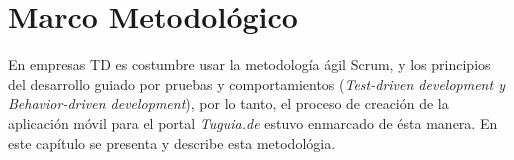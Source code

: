 \chapter{Marco Metodológico} \label{chap:marco_metodologico}

\vspace{5 mm}

En empresas TD es costumbre usar la metodología ágil Scrum, y los principios del desarrollo guiado por pruebas y comportamientos (\textit{Test-driven development y Behavior-driven development}), por lo tanto, el proceso de creación de la aplicación móvil para el portal \textit{Tuguia.de} estuvo enmarcado de ésta manera. En este capítulo se presenta y describe esta metodológia.